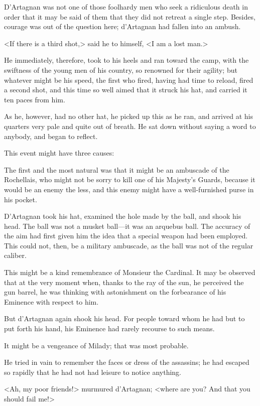 D'Artagnan was not one of those foolhardy men who seek a ridiculous death in order that it may be said of them that they did not retreat a single step. Besides, courage was out of the question here; d'Artagnan had fallen into an ambush. 

<If there is a third shot,> said he to himself, <I am a lost man.> 

He immediately, therefore, took to his heels and ran toward the camp, with the swiftness of the young men of his country, so renowned for their agility; but whatever might be his speed, the first who fired, having had time to reload, fired a second shot, and this time so well aimed that it struck his hat, and carried it ten paces from him. 

As he, however, had no other hat, he picked up this as he ran, and arrived at his quarters very pale and quite out of breath. He sat down without saying a word to anybody, and began to reflect. 

This event might have three causes: 

The first and the most natural was that it might be an ambuscade of the Rochellais, who might not be sorry to kill one of his Majesty's Guards, because it would be an enemy the less, and this enemy might have a well-furnished purse in his pocket. 

D'Artagnan took his hat, examined the hole made by the ball, and shook his head. The ball was not a musket ball---it was an arquebus ball. The accuracy of the aim had first given him the idea that a special weapon had been employed. This could not, then, be a military ambuscade, as the ball was not of the regular caliber. 

This might be a kind remembrance of Monsieur the Cardinal. It may be observed that at the very moment when, thanks to the ray of the sun, he perceived the gun barrel, he was thinking with astonishment on the forbearance of his Eminence with respect to him. 

But d'Artagnan again shook his head. For people toward whom he had but to put forth his hand, his Eminence had rarely recourse to such means. 

It might be a vengeance of Milady; that was most probable. 

He tried in vain to remember the faces or dress of the assassins; he had escaped so rapidly that he had not had leisure to notice anything. 

<Ah, my poor friends!> murmured d'Artagnan; <where are you? And that you should fail me!> 


